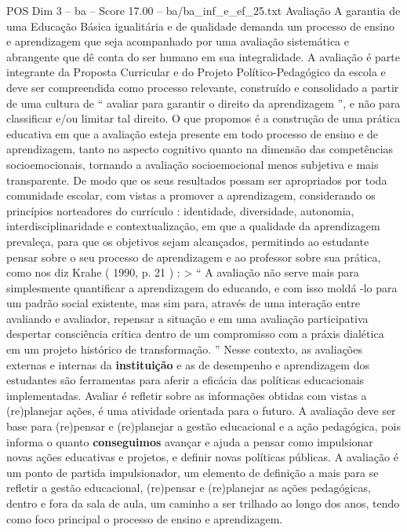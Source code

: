 \begin{textsample}{POS Dim 3 – ba – Score 17.00 – ba/ba\_inf\_e\_ef\_25.txt}  \label{ex:f3_pos_175}
Avaliação A garantia de uma Educação Básica igualitária e de qualidade demanda um processo de ensino e aprendizagem que seja acompanhado por uma avaliação sistemática e abrangente que dê conta do ser humano em sua integralidade.
A avaliação é parte integrante da Proposta Curricular e do Projeto Político-Pedagógico da escola e deve ser compreendida como processo relevante, construído e consolidado a partir de uma cultura de “ avaliar para garantir o direito da aprendizagem ”, e não para classificar e/ou limitar tal direito.
O que propomos é a construção de uma prática educativa em que a avaliação esteja presente em todo processo de ensino e de aprendizagem, tanto no aspecto cognitivo quanto na dimensão das competências socioemocionais, tornando a avaliação socioemocional menos subjetiva e mais transparente.
De modo que os seus resultados possam ser apropriados por toda comunidade escolar, com vistas a promover a aprendizagem, considerando os princípios norteadores do currículo : identidade, diversidade, autonomia, interdisciplinaridade e contextualização, em que a qualidade da aprendizagem prevaleça, para que os objetivos sejam alcançados, permitindo ao estudante pensar sobre o seu processo de aprendizagem e ao professor sobre sua prática, como nos diz Krahe ( 1990, p. 21 ) : > “ A avaliação não serve mais para simplesmente quantificar a aprendizagem do educando, e com isso moldá -lo para um padrão social existente, mas sim para, através de uma interação entre avaliando e avaliador, repensar a situação e em uma avaliação participativa despertar consciência crítica dentro de um compromisso com a práxis dialética em um projeto histórico de transformação. ” Nesse contexto, as avaliações externas e internas da \textbf{instituição} e as de desempenho e aprendizagem dos estudantes são ferramentas para aferir a eficácia das políticas educacionais implementadas.
Avaliar é refletir sobre as informações obtidas com vistas a (re)planejar ações, é uma atividade orientada para o futuro.
A avaliação deve ser base para (re)pensar e (re)planejar a gestão educacional e a ação pedagógica, pois informa o quanto \textbf{conseguimos} avançar e ajuda a pensar como impulsionar novas ações educativas e projetos, e definir novas políticas públicas.
A avaliação é um ponto de partida impulsionador, um elemento de definição a mais para se refletir a gestão educacional, (re)pensar e (re)planejar as ações pedagógicas, dentro e fora da sala de aula, um caminho a ser trilhado ao longo dos anos, tendo como foco principal o processo de ensino e aprendizagem.

\end{textsample}
